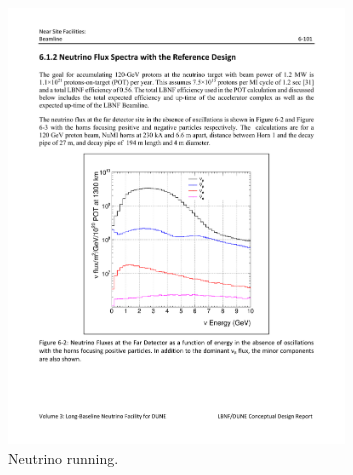 \begin{figure}
  \centering
  \begin{subfigure}[t]{0.48\linewidth}
    \centering
    \includegraphics[width=0.98\textwidth]{DUNEBeamFluxesNeutrino.pdf}
    \caption{Neutrino running.}
    \label{fig:DUNEBeamFluxesNeutrino}
  \end{subfigure}
  \hfill
  \begin{subfigure}[t]{0.48\linewidth}
    \centering

\end{subfigure}
\end{figure}
